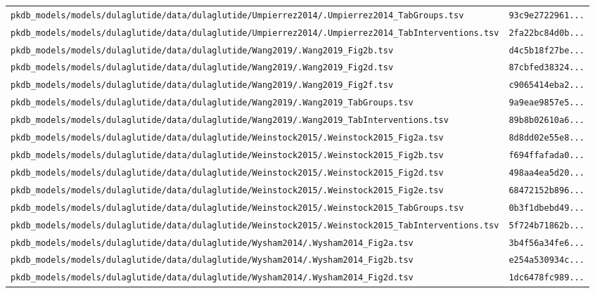 \documentclass{article}
\begin{document}
\begin{longtable}{ll}
\texttt{pkdb\_models/models/dulaglutide/data/dulaglutide/Umpierrez2014/.Umpierrez2014\_TabGroups.tsv} & \texttt{93c9e2722961...} \\
\texttt{pkdb\_models/models/dulaglutide/data/dulaglutide/Umpierrez2014/.Umpierrez2014\_TabInterventions.tsv} & \texttt{2fa22bc84d0b...} \\
\texttt{pkdb\_models/models/dulaglutide/data/dulaglutide/Wang2019/.Wang2019\_Fig2b.tsv} & \texttt{d4c5b18f27be...} \\
\texttt{pkdb\_models/models/dulaglutide/data/dulaglutide/Wang2019/.Wang2019\_Fig2d.tsv} & \texttt{87cbfed38324...} \\
\texttt{pkdb\_models/models/dulaglutide/data/dulaglutide/Wang2019/.Wang2019\_Fig2f.tsv} & \texttt{c9065414eba2...} \\
\texttt{pkdb\_models/models/dulaglutide/data/dulaglutide/Wang2019/.Wang2019\_TabGroups.tsv} & \texttt{9a9eae9857e5...} \\
\texttt{pkdb\_models/models/dulaglutide/data/dulaglutide/Wang2019/.Wang2019\_TabInterventions.tsv} & \texttt{89b8b02610a6...} \\
\texttt{pkdb\_models/models/dulaglutide/data/dulaglutide/Weinstock2015/.Weinstock2015\_Fig2a.tsv} & \texttt{8d8dd02e55e8...} \\
\texttt{pkdb\_models/models/dulaglutide/data/dulaglutide/Weinstock2015/.Weinstock2015\_Fig2b.tsv} & \texttt{f694ffafada0...} \\
\texttt{pkdb\_models/models/dulaglutide/data/dulaglutide/Weinstock2015/.Weinstock2015\_Fig2d.tsv} & \texttt{498aa4ea5d20...} \\
\texttt{pkdb\_models/models/dulaglutide/data/dulaglutide/Weinstock2015/.Weinstock2015\_Fig2e.tsv} & \texttt{68472152b896...} \\
\texttt{pkdb\_models/models/dulaglutide/data/dulaglutide/Weinstock2015/.Weinstock2015\_TabGroups.tsv} & \texttt{0b3f1dbebd49...} \\
\texttt{pkdb\_models/models/dulaglutide/data/dulaglutide/Weinstock2015/.Weinstock2015\_TabInterventions.tsv} & \texttt{5f724b71862b...} \\
\texttt{pkdb\_models/models/dulaglutide/data/dulaglutide/Wysham2014/.Wysham2014\_Fig2a.tsv} & \texttt{3b4f56a34fe6...} \\
\texttt{pkdb\_models/models/dulaglutide/data/dulaglutide/Wysham2014/.Wysham2014\_Fig2b.tsv} & \texttt{e254a530934c...} \\
\texttt{pkdb\_models/models/dulaglutide/data/dulaglutide/Wysham2014/.Wysham2014\_Fig2d.tsv} & \texttt{1dc6478fc989...} \\

\end{longtable}
\end{document}
